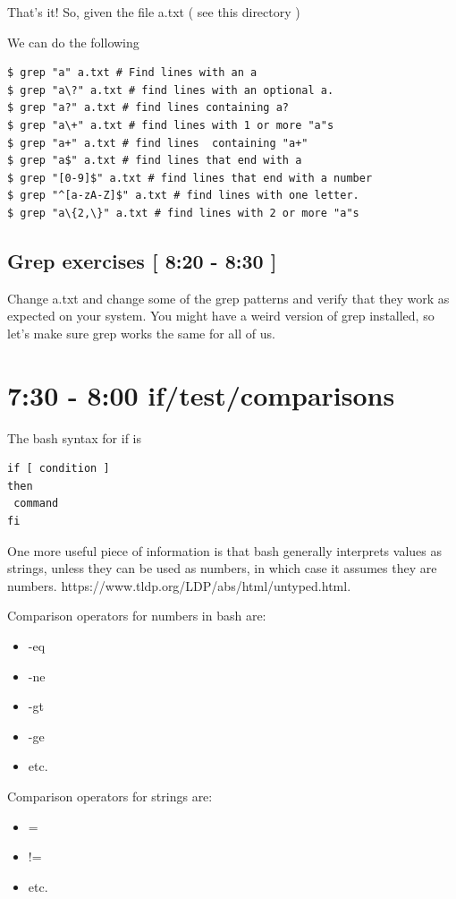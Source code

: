\documentclass[10pt]{article}
\begin{document}
That's it! So, given the file a.txt ( see this directory )

We can do the following

\begin{lstlisting}[style=term]
$ grep "a" a.txt # Find lines with an a
$ grep "a\?" a.txt # find lines with an optional a.
$ grep "a?" a.txt # find lines containing a?
$ grep "a\+" a.txt # find lines with 1 or more "a"s
$ grep "a+" a.txt # find lines  containing "a+" 
$ grep "a$" a.txt # find lines that end with a
$ grep "[0-9]$" a.txt # find lines that end with a number
$ grep "^[a-zA-Z]$" a.txt # find lines with one letter.
$ grep "a\{2,\}" a.txt # find lines with 2 or more "a"s
\end{lstlisting}


\subsection{ Grep exercises [ 8:20 - 8:30 ] }
Change a.txt and change some of the grep patterns and verify that they work as expected on your system. You might have a weird version of grep installed, so let's make sure grep works the same for all of us.


\section{ 7:30 - 8:00  if/test/comparisons}
The bash syntax for if is 

\begin{verbatim}
if [ condition ]
then
 command
fi
\end{verbatim}

One more useful piece of information is that bash generally interprets values as strings, unless they can be used as numbers, in which case it assumes they are numbers. https://www.tldp.org/LDP/abs/html/untyped.html.

Comparison operators for numbers in bash are:

\begin{itemize}
\item -eq
\item -ne
\item -gt
\item -ge 
\item etc.
\end{itemize}

Comparison operators for strings are:

\begin{itemize}
\item =
\item !=
\item etc.
\end{itemize}
\end{document}
